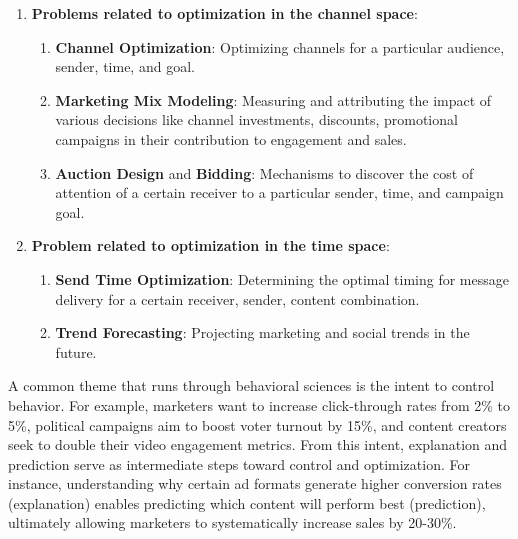 \begin{enumerate}
\item \textbf{Problems related to optimization in the channel space}:
    \begin{enumerate}
        \item \textbf{Channel Optimization}: Optimizing channels for a particular audience, sender, time, and goal.
        \item \textbf{Marketing Mix Modeling}: Measuring and attributing the impact of various decisions like channel investments, discounts, promotional campaigns in their contribution to engagement and sales. 
        \item \textbf{Auction Design} and \textbf{Bidding}: Mechanisms to discover the cost of attention of a certain receiver to a particular sender, time, and campaign goal.
    \end{enumerate}
    
\item \textbf{Problem related to optimization in the time space}:
    \begin{enumerate}
        \item \textbf{Send Time Optimization}: Determining the optimal timing for message delivery for a certain receiver, sender, content combination.

        \item \textbf{Trend Forecasting}: Projecting marketing and social trends in the future.
    \end{enumerate}
        
\end{enumerate}







A common theme that runs through behavioral sciences is the intent to control behavior. For example, marketers want to increase click-through rates from 2\% to 5\%, political campaigns aim to boost voter turnout by 15\%, and content creators seek to double their video engagement metrics. From this intent, explanation and prediction serve as intermediate steps toward control and optimization. For instance, understanding why certain ad formats generate higher conversion rates (explanation) enables predicting which content will perform best (prediction), ultimately allowing marketers to systematically increase sales by 20-30\%. 

